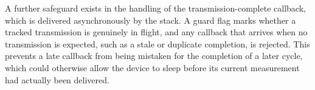 A further safeguard exists in the handling of the transmission-complete callback, which is delivered asynchronously by the stack.
A guard flag marks whether a tracked transmission is genuinely in flight, and any callback that arrives when no transmission is expected, such as a stale or duplicate completion, is rejected.
This prevents a late callback from being mistaken for the completion of a later cycle, which could otherwise allow the device to sleep before its current measurement had actually been delivered.